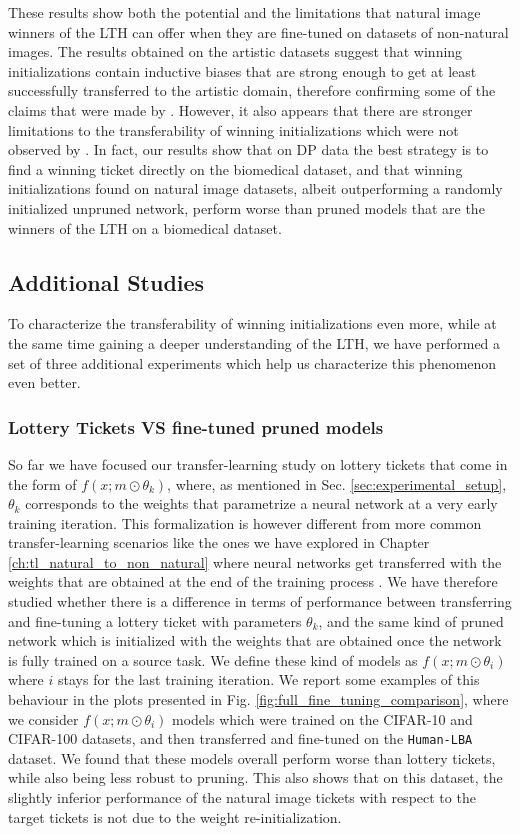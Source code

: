 These results show both the potential and the limitations that natural image winners of the LTH can offer when they are fine-tuned on datasets of non-natural images. The results obtained on the artistic datasets suggest that winning initializations contain inductive biases that are strong enough to get at least successfully transferred to the artistic domain, therefore confirming some of the claims that were made by \citet{morcos2019one}. However, it also appears that there are stronger limitations to the transferability of winning initializations which were not observed by \citet{morcos2019one}. In fact, our results show that on DP data the best strategy is to find a winning ticket directly on the biomedical dataset, and that winning initializations found on natural image datasets, albeit outperforming a randomly initialized unpruned network, perform worse than pruned models that are the winners of the LTH on a biomedical dataset.

\subsection{Additional Studies}
\label{sec:additional_studies}
To characterize the transferability of winning initializations even more, while at the same time gaining a deeper understanding of the LTH, we have performed a set of three additional experiments which help us characterize this phenomenon even better. 

\subsubsection{Lottery Tickets VS fine-tuned pruned models}
So far we have focused our transfer-learning study on lottery tickets that come in the form of $f(x;m\odot\theta_k)$, where, as mentioned in Sec. \ref{sec:experimental_setup}, $\theta_k$ corresponds to the weights that parametrize a neural network at a very early training iteration. This formalization is however different from more common transfer-learning scenarios like the ones we have explored in Chapter \ref{ch:tl_natural_to_non_natural} where neural networks get transferred with the weights that are obtained at the end of the training process \cite{mormont2018comparison,sabatelli2018deep}. We have therefore studied whether there is a difference in terms of performance between transferring and fine-tuning a lottery ticket with parameters $\theta_k$, and the same kind of pruned network which is initialized with the weights that are obtained once the network is fully trained on a source task. We define these kind of models as $f(x;m\odot\theta_i)$ where $i$ stays for the last training iteration. We report some examples of this behaviour in the plots presented in Fig. \ref{fig:full_fine_tuning_comparison}, where we consider $f(x;m\odot\theta_i)$ models which were trained on the CIFAR-10 and CIFAR-100 datasets, and then transferred and fine-tuned on the \texttt{Human-LBA} dataset. We found that these models overall perform worse than lottery tickets, while also being less robust to pruning. This also shows that on this dataset, the slightly inferior performance of the natural image tickets with respect to the target tickets is not due to the weight re-initialization.

